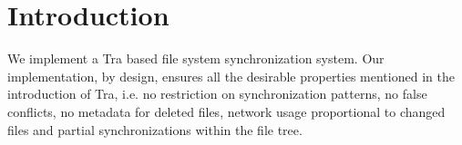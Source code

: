 \section {Introduction}
We implement a Tra based file system synchronization system. Our implementation, by design, ensures all the desirable properties mentioned in the introduction of Tra, i.e. no restriction on synchronization patterns, no false conflicts, no metadata for deleted files, network usage proportional to changed files and partial synchronizations within the file tree.
